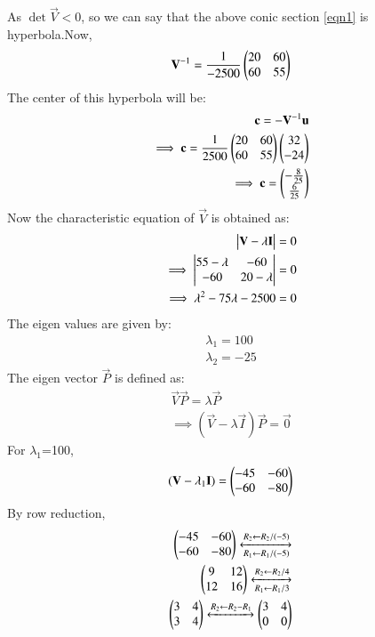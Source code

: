 \documentclass[journal,12pt,twocolumn]{IEEEtran}
\begin{document}
As $\det{\vec{V}}<0$, so we can say that the above conic section \ref{eqn1} is hyperbola.Now,
\begin{align}
\mathbf{V}^{-1} =\frac{1}{-2500} \begin{pmatrix}20 & 60\\60 & 55\end{pmatrix}
\end{align}
The center of this hyperbola will be:
\begin{align}
\mathbf{c} = - \mathbf{V}^{-1} \mathbf{u}\\
\implies \mathbf{c} = \frac{1}{2500} \begin{pmatrix}20 & 60\\60 & 55\end{pmatrix} \begin{pmatrix}32 \\ -24\end{pmatrix}\\
\implies \mathbf{c} = \begin{pmatrix}-\frac{8}{25} \\ \frac{6}{25}\end{pmatrix}\\
\end{align}
 Now the characteristic equation of $\vec{V}$ is obtained as:
\begin{align}
\begin{vmatrix}\mathbf{V} - \lambda\mathbf{I}\end{vmatrix} =0\\
\implies \begin{vmatrix}55-\lambda & -60\\-60 & 20-\lambda\end{vmatrix} = 0\\
\implies \lambda^2 - 75\lambda - 2500=0
\end{align}
The eigen values are given by:
\begin{align}
\lambda_1=100\\
\lambda_2 = -25
\end{align}
The eigen vector $\vec{P}$ is defined as:
\begin{align}
\vec{V}\vec{P} = \lambda \vec{P}\\
\implies (\vec{V} -\lambda\vec{I})\vec{P} = \vec{0}
\end{align}
For $\lambda_1$=100,
\begin{align}
(\mathbf{V} -\lambda_1\mathbf{I}) = \begin{pmatrix}-45 & -60\\-60 & -80\end{pmatrix}
\end{align}
By row reduction,
\begin{align}
\begin{pmatrix}-45 & -60\\-60 & -80\end{pmatrix}\xleftrightarrow[R_1\leftarrow R_1 /(-5)]{R_2\leftarrow R_2/(-5)}\\
\begin{pmatrix}9 & 12\\12 & 16\end{pmatrix}\xleftrightarrow[R_1\leftarrow R_1 /3]{R_2\leftarrow R_2/4}\\
\begin{pmatrix}3 & 4\\3 & 4\end{pmatrix}\xleftrightarrow[]{R_2\leftarrow R_2-R_1}\begin{pmatrix}3 & 4\\0 & 0\end{pmatrix}
\end{align}
\end{document}
